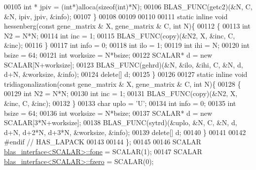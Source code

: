 \begin{DoxyCode}
00105     \textcolor{keywordtype}{int} * jpiv = (\textcolor{keywordtype}{int}*)alloca(\textcolor{keyword}{sizeof}(\textcolor{keywordtype}{int})*N);
00106     BLAS\_FUNC(getc2)(&N, C, &N, ipiv, jpiv, &info);
00107   \}
00108 
00109 
00110 
00111   \textcolor{keyword}{static} \textcolor{keyword}{inline} \textcolor{keywordtype}{void} hessenberg(\textcolor{keyword}{const} gene\_matrix & X, gene\_matrix & C, \textcolor{keywordtype}{int} N)\{
00112     \{
00113       \textcolor{keywordtype}{int} N2 = N*N;
00114       \textcolor{keywordtype}{int} inc = 1;
00115       BLAS\_FUNC(copy)(&N2, X, &inc, C, &inc);
00116     \}
00117     \textcolor{keywordtype}{int} info = 0;
00118     \textcolor{keywordtype}{int} ilo = 1;
00119     \textcolor{keywordtype}{int} ihi = N;
00120     \textcolor{keywordtype}{int} bsize = 64;
00121     \textcolor{keywordtype}{int} worksize = N*bsize;
00122     SCALAR* d = \textcolor{keyword}{new} SCALAR[N+worksize];
00123     BLAS\_FUNC(gehrd)(&N, &ilo, &ihi, C, &N, d, d+N, &worksize, &info);
00124     \textcolor{keyword}{delete}[] d;
00125   \}
00126 
00127   \textcolor{keyword}{static} \textcolor{keyword}{inline} \textcolor{keywordtype}{void} tridiagonalization(\textcolor{keyword}{const} gene\_matrix & X, gene\_matrix & C, \textcolor{keywordtype}{int} N)\{
00128     \{
00129       \textcolor{keywordtype}{int} N2 = N*N;
00130       \textcolor{keywordtype}{int} inc = 1;
00131       BLAS\_FUNC(copy)(&N2, X, &inc, C, &inc);
00132     \}
00133     \textcolor{keywordtype}{char} uplo = \textcolor{charliteral}{'U'};
00134     \textcolor{keywordtype}{int} info = 0;
00135     \textcolor{keywordtype}{int} bsize = 64;
00136     \textcolor{keywordtype}{int} worksize = N*bsize;
00137     SCALAR* d = \textcolor{keyword}{new} SCALAR[3*N+worksize];
00138     BLAS\_FUNC(sytrd)(&uplo, &N, C, &N, d, d+N, d+2*N, d+3*N, &worksize, &info);
00139     \textcolor{keyword}{delete}[] d;
00140   \}
00141   
00142 \textcolor{preprocessor}{  #endif // HAS\_LAPACK}
00143 
00144 \};
00145 
00146 SCALAR \hyperlink{classblas__interface}{blas\_interface<SCALAR>::fone} = SCALAR(1);
00147 SCALAR \hyperlink{classblas__interface}{blas\_interface<SCALAR>::fzero} = SCALAR(0);
\end{DoxyCode}
